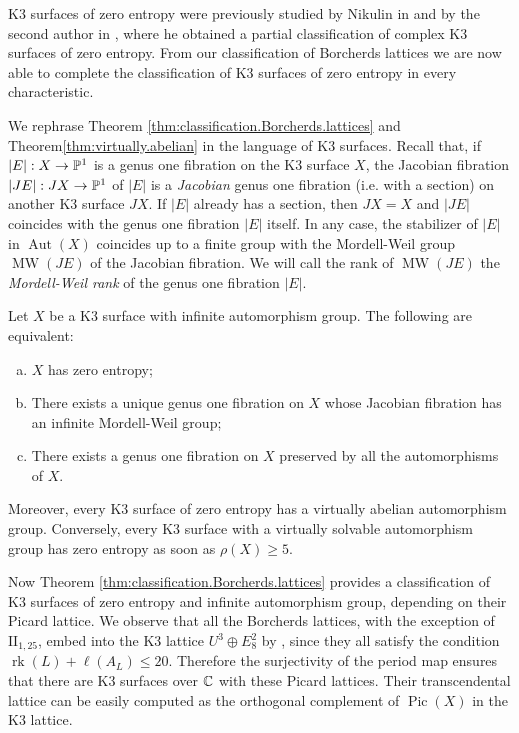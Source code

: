 \documentclass[11pt,letterpaper]{amsart}
\DeclareMathOperator{\rk}{rk}
\DeclareMathOperator{\Aut}{Aut}
\DeclareMathOperator{\Pic}{Pic}
\DeclareMathOperator{\MW}{MW}
\begin{document}
K3 surfaces of zero entropy were previously studied by Nikulin in \cite{nikulin.preserves} and by the second author in \cite{mezzedimi.entropy}, where he obtained a partial classification of complex K3 surfaces of zero entropy. From our classification of Borcherds lattices we are now able to complete the classification of K3 surfaces of zero entropy in every characteristic.

We rephrase Theorem \ref{thm:classification.Borcherds.lattices} and Theorem\ref{thm:virtually.abelian} in the language of K3 surfaces. Recall that, if $|E|:X\rightarrow \mathbb{P}^1$ is a genus one fibration on the K3 surface $X$, the Jacobian fibration $|JE|:JX\rightarrow \mathbb{P}^1$ of $|E|$ is a \emph{Jacobian} genus one fibration (i.e. with a section) on another K3 surface $JX$. If $|E|$ already has a section, then $JX=X$ and $|JE|$ coincides with the genus one fibration $|E|$ itself. In any case, the stabilizer of $|E|$ in $\Aut(X)$ coincides up to a finite group with the Mordell-Weil group $\MW(JE)$ of the Jacobian fibration. We will call the rank of $\MW(JE)$ the \emph{Mordell-Weil rank} of the genus one fibration $|E|$.

\begin{theorem} \label{thm:equivalent.characterizations.K3}
Let $X$ be a K3 surface with infinite automorphism group. The following are equivalent:
\begin{enumerate}[(a)]
    \item $X$ has zero entropy;
    \item There exists a unique genus one fibration on $X$ whose Jacobian fibration has an infinite Mordell-Weil group;
    \item There exists a genus one fibration on $X$ preserved by all the automorphisms of $X$.
\end{enumerate}

Moreover, every K3 surface of zero entropy has a virtually abelian automorphism group. Conversely, every K3 surface with a virtually solvable automorphism group has zero entropy as soon as $\rho(X)\ge 5$.
\end{theorem}



Now Theorem \ref{thm:classification.Borcherds.lattices} provides a classification of K3 surfaces of zero entropy and infinite automorphism group, depending on their Picard lattice. We observe that all the Borcherds lattices, with the exception of $\mathrm{II}_{1,25}$, embed into the K3 lattice $U^3\oplus E_8^2$ by \cite[Corollary~1.12.3]{nikulin.integral.symmetric.bilinear}, since they all satisfy the condition $\rk(L)+\ell(A_L)\le 20$. Therefore the surjectivity of the period map ensures that there are K3 surfaces over $\mathbb{C}$ with these Picard lattices. Their transcendental lattice can be easily computed as the orthogonal complement of $\Pic(X)$ in the K3 lattice.
\end{document}
